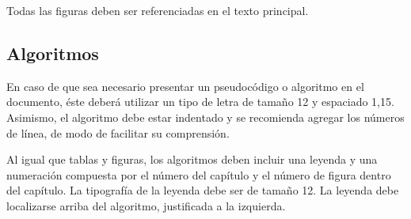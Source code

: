 Todas las figuras deben ser referenciadas en el texto principal. 

\subsection{Algoritmos}
En caso de que sea necesario presentar un pseudocódigo o algoritmo en el documento, éste deberá utilizar un tipo de letra de tamaño 12 y espaciado 1,15. Asimismo, el algoritmo debe estar indentado y se recomienda agregar los números de línea, de modo de facilitar su comprensión.  

Al igual que tablas y figuras, los algoritmos deben incluir una leyenda y una numeración compuesta por el número del capítulo y el número de figura dentro del capítulo. La tipografía de la leyenda debe ser de tamaño 12. La leyenda debe localizarse arriba del algoritmo, justificada a la izquierda. 
